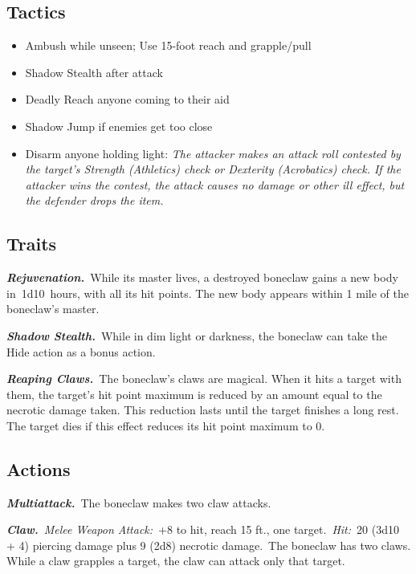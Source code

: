 \documentclass[10pt,twocolumn]{article}
\let\oldtextbf\textbf
\renewcommand{\textbf}[1]{\oldtextbf{{#1}}}
\providecommand{\tightlist}{
  \setlength{\itemsep}{4pt}
  \setlength{\topsep}{0pt}
  \setlength{\parsep}{0pt}
  \setlength{\parskip}{0pt}
  \setlength{\partopsep}{0pt}
}
\begin{document}
\subsection{Tactics}\label{tactics}

\setlength{\itemsep}{0pt}

\begin{itemize}
\tightlist
\item
  Ambush while unseen; Use 15-foot reach and grapple/pull
\item
  Shadow Stealth after attack~
\item
  Deadly Reach anyone coming to their aid
\item
  Shadow Jump if enemies get too close
\item
  Disarm anyone holding light: \emph{The attacker makes an attack roll
  contested by the target's Strength (Athletics) check or Dexterity
  (Acrobatics) check. If the attacker wins the contest, the attack
  causes no damage or other ill effect, but the defender drops the
  item.}
\end{itemize}

\subsection{Traits}\label{traits}

\emph{\textbf{Rejuvenation.}}~While its master lives, a destroyed
boneclaw gains a new body in~1d10~hours, with all its hit points. The
new body appears within 1 mile of the boneclaw's master.

\emph{\textbf{Shadow Stealth.}}~While in dim light or darkness, the
boneclaw can take the Hide action as a bonus action.

\emph{\textbf{Reaping Claws.}}~The boneclaw's claws are magical. When it
hits a target with them, the target's hit point maximum is reduced by an
amount equal to the necrotic damage taken. This reduction lasts until
the target finishes a long rest. The target dies if this effect reduces
its hit point maximum to 0.

\subsection{Actions}\label{actions-1}

\emph{\textbf{Multiattack.}}~The boneclaw makes two claw attacks.

\emph{\textbf{Claw.}}~\emph{Melee Weapon Attack:}~+8 to hit, reach 15
ft., one target.~\emph{Hit:}~20 (3d10 + 4) piercing damage plus 9 (2d8)
necrotic damage.~The boneclaw has two claws. While a claw grapples a
target, the claw can attack only that target.
\end{document}
